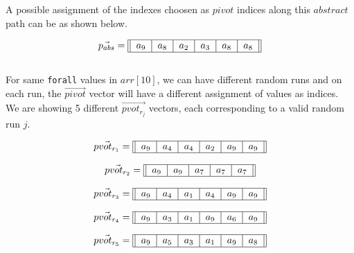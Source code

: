 \documentclass[usenames,dvipsnames,acmsmall]{acmart}
\begin{document}
A possible assignment of the indexes choosen as $pivot$ indices along this $abstract$ path can be as shown below.

\begin{equation}
	\vec{p_{abs}} = \begin{tabular}{||c|c|c|c|c|c||}
		\hline
		$a_9$ & $a_8$ & $a_2$ & $a_3$ & $a_8$ & $a_8$ \\
		\hline
	\end{tabular}
\end{equation} \\

For same \texttt{forall} values in $arr[10]$, we can have different random runs and on each run, the $\vec{pivot}$ vector will have a different assignment of values as indices. We are showing 5 different $\vec{pvot_{r_{j}}}$ vectors, each corresponding to a valid random run $j$.

\begin{equation}
	\vec{pvot_{r_{1}}} = \begin{tabular}{||c|c|c|c|c|c||}
		\hline
		$a_9$ & $a_4$ & $a_4$ & $a_2$ & $a_9$ & $a_9$ \\
		\hline
	\end{tabular}
\end{equation} 

\begin{equation}
	\vec{pvot_{r_{2}}} = \begin{tabular}{||c|c|c|c|c||}
		\hline
		$a_9$ & $a_9$ & $a_7$ & $a_7$ & $a_7$ \\
		\hline
	\end{tabular}
\end{equation} 

\begin{equation}
	\vec{pvot_{r_{3}}} = \begin{tabular}{||c|c|c|c|c|c||}
		\hline
		$a_9$ & $a_4$ & $a_1$ & $a_4$ & $a_9$ & $a_9$ \\
		\hline
	\end{tabular}
\end{equation} 

\begin{equation}
	\vec{pvot_{r_{4}}} = \begin{tabular}{||c|c|c|c|c|c||}
		\hline
		$a_9$ & $a_3$ & $a_1$ & $a_9$ & $a_6$ & $a_9$ \\
		\hline
	\end{tabular}
\end{equation} 

\begin{equation}
	\vec{pvot_{r_{5}}} = \begin{tabular}{||c|c|c|c|c|c||}
		\hline
		$a_9$ & $a_5$ & $a_3$ & $a_1$ & $a_9$ & $a_8$ \\
		\hline
	\end{tabular}
\end{equation}  
\end{document}
